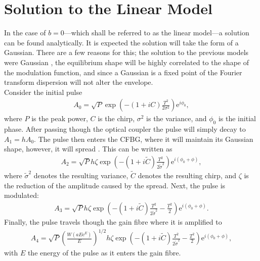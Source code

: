 \section{Solution to the Linear Model}
\label{sec:linear}
In the case of $b = 0$---which shall be referred to as the linear model---a solution can be found analytically. It is expected the solution will take the form of a Gaussian. There are a few reasons for this; the solution to the previous models were Gaussian \cite{cutler, seigman, kuizenga1970a, martinez1984, martinez1985}, the equilibrium shape will be highly correlated to the shape of the modulation function, and since a Gaussian is a fixed point of the Fourier transform \cite{gradshteyn} dispersion will not alter the envelope. \\

Consider the initial pulse
\begin{align*}
	A_0 = \sqrt{P} \exp \left( -(1 + iC) \frac{T^2}{2 \sigma^2} \right) \textrm{e}^{i \phi_0},
\end{align*}
where $P$ is the peak power, $C$ is the chirp, $\sigma^2$ is the variance, and $\phi_0$ is the initial phase. After passing though the optical coupler the pulse will simply decay to $A_1 = h A_0$. The pulse then enters the CFBG, where it will maintain its Gaussian shape, however, it will spread \cite{agrawal2013, ferreira, silfvast}. This can be written as
\begin{align*}
A_2 = \sqrt{P} h \zeta \exp \left( -(1 + i \widetilde{C}) \frac{T^2}{2 \widetilde{\sigma}^2} \right) \textrm{e}^{i(\phi_0 + \phi)},
\end{align*}
where $\widetilde{\sigma}^2$ denotes the resulting variance, $\widetilde{C}$ denotes the resulting chirp, and $\zeta$ is the reduction of the amplitude caused by the spread. Next, the pulse is modulated:
\begin{align*}
A_3 = \sqrt{P} h \zeta \exp \left( -(1 + i \widetilde{C}) \frac{T^2}{2 \widetilde{\sigma}^2} - \frac{T^2}{2} \right) \textrm{e}^{i(\phi_0 + \phi)}.
\end{align*}
Finally, the pulse travels though the gain fibre where it is amplified to
\begin{align*}
A_4 = \sqrt{P} \left( \frac{W(a E \textrm{e}^E)}{E} \right)^{1/2} h \zeta \exp \left( -(1 + i \widetilde{C}) \frac{T^2}{2 \widetilde{\sigma}^2} - \frac{T^2}{2} \right) \textrm{e}^{i(\phi_0 + \phi)},
\end{align*}
with $E$ the energy of the pulse as it enters the gain fibre. \\

